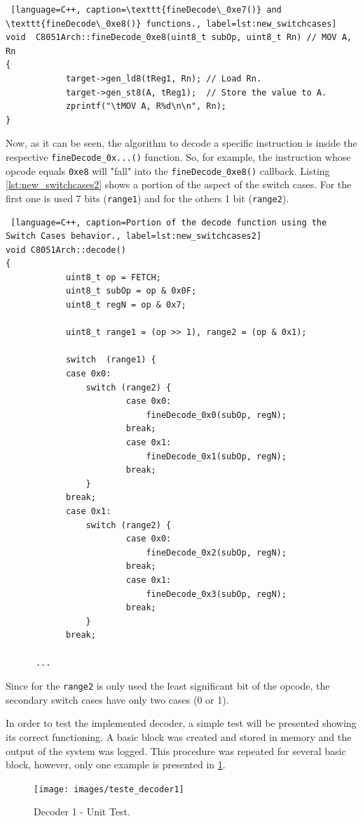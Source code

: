\documentclass[12pt]{article}
\newcounter{subsubsubsection}[subsubsection]
\begin{document}
{\begin{lstlisting} [language=C++, caption=\texttt{fineDecode\_0xe7()} and \texttt{fineDecode\_0xe8()} functions., label=lst:new_switchcases]
void  C8051Arch::fineDecode_0xe8(uint8_t subOp, uint8_t Rn)	// MOV A, Rn
{   
			target->gen_ld8(tReg1, Rn); // Load Rn.
			target->gen_st8(A, tReg1);  // Store the value to A.
			zprintf("\tMOV A, R%d\n\n", Rn); 
}
\end{lstlisting}

Now, as it can be seen, the algorithm to decode a specific instruction is inside the respective \texttt{fineDecode\_0x...()} function. So, for example, the instruction whose opcode equals \texttt{0xe8} will "fall" into the \texttt{fineDecode\_0xe8()} callback. Listing \ref{lst:new_switchcases2} shows a portion of the aspect of the switch cases. For the first one is used 7 bits (\texttt{range1}) and for the others 1 bit (\texttt{range2}).

\begin{lstlisting} [language=C++, caption=Portion of the decode function using the Switch Cases behavior., label=lst:new_switchcases2]
void C8051Arch::decode()
{
			uint8_t op = FETCH;
			uint8_t subOp = op & 0x0F;
			uint8_t regN = op & 0x7;
	
			uint8_t range1 = (op >> 1), range2 = (op & 0x1);

			switch  (range1) {
			case 0x0:
	  			switch (range2) {
	  					case 0x0:
	    					fineDecode_0x0(subOp, regN);
	    				break;
	  					case 0x1:
	    					fineDecode_0x1(subOp, regN);
	   					break;
	  			}
			break;
			case 0x1:
	  			switch (range2) {
	  					case 0x0:
	    					fineDecode_0x2(subOp, regN);
	    				break;
	  					case 0x1:
	    					fineDecode_0x3(subOp, regN);
	    				break;
	  			}
			break;
            
	  ...
\end{lstlisting}

Since for the \texttt{range2} is only used the least significant bit of the opcode, the secondary switch cases have only two cases (0 or 1).	 


In order to test the implemented decoder, a simple test will be presented showing its correct functioning. A basic block was created and stored in memory and the output of the system was logged. This procedure was repeated for several basic block, however, only one example is presented in \ref{fig:teste1_decoder}.   


\begin{figure}[H]
\centerline{
\texttt{[image: images/teste\_decoder1]}
}
\caption{Decoder 1 - Unit Test.}
\label{fig:teste1_decoder} 
\end{figure}

}
\end{document}
